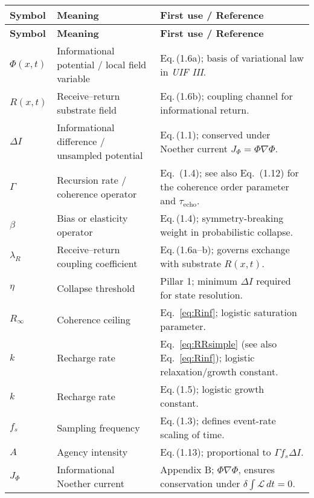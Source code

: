 \vspace{0.5em}
\begin{longtable}{@{}L{0.20\textwidth}L{0.30\textwidth}L{0.45\textwidth}@{}}
\toprule
\textbf{Symbol} & \textbf{Meaning} & \textbf{First use / Reference}\\
\midrule
\endfirsthead
\toprule
\textbf{Symbol} & \textbf{Meaning} & \textbf{First use / Reference}\\
\midrule
\endhead
\bottomrule
\endfoot

$\Phi(x,t)$ & Informational potential / local field variable &
Eq.\,(1.6a); basis of variational law in \textit{UIF III}.\\[3pt]

$R(x,t)$ & Receive–return substrate field &
Eq.\,(1.6b); coupling channel for informational return.\\[3pt]

$\Delta I$ & Informational difference / unsampled potential &
Eq.\,(1.1); conserved under Noether current $J_\Phi=\Phi\nabla\Phi$.\\[3pt]

$\Gamma$ & Recursion rate / coherence operator &
Eq.~(1.4); see also Eq.~(1.12) for the coherence order parameter and $\tau_{\text{echo}}$.\\[3pt]

$\beta$ & Bias or elasticity operator &
Eq.\,(1.4); symmetry-breaking weight in probabilistic collapse.\\[3pt]

$\lambda_R$ & Receive–return coupling coefficient &
Eq.\,(1.6a–b); governs exchange with substrate $R(x,t)$.\\[3pt]

$\eta$ & Collapse threshold &
Pillar 1; minimum $\Delta I$ required for state resolution.\\[3pt]

$R_\infty$ & Coherence ceiling & Eq.~\eqref{eq:Rinf}; logistic saturation parameter.\\[3pt]
$k$        & Recharge rate      & Eq.~\eqref{eq:RRsimple} (see also Eq.~\eqref{eq:Rinf}); logistic relaxation/growth constant.\\[3pt]


$k$ & Recharge rate &
Eq.\,(1.5); logistic growth constant.\\[3pt]

$f_s$ & Sampling frequency &
Eq.\,(1.3); defines event-rate scaling of time.\\[3pt]

$A$ & Agency intensity &
Eq.\,(1.13); proportional to $\Gamma f_s\Delta I$.\\[3pt]

$J_\Phi$ & Informational Noether current &
Appendix B; $\Phi\nabla\Phi$, ensures conservation under $\delta\!\int\mathcal{L}\,dt=0$.\\[3pt]

\end{longtable}
\clearpage

